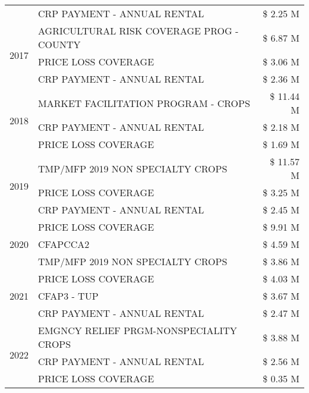 \begin{tabular}{llr}
 & CRP PAYMENT - ANNUAL RENTAL & \$ 2.25 M \\
\cline{1-3}
\multirow[t]{3}{*}{2017} & AGRICULTURAL RISK COVERAGE PROG - COUNTY & \$ 6.87 M \\
 & PRICE LOSS COVERAGE & \$ 3.06 M \\
 & CRP PAYMENT - ANNUAL RENTAL & \$ 2.36 M \\
\cline{1-3}
\multirow[t]{3}{*}{2018} & MARKET FACILITATION PROGRAM - CROPS & \$ 11.44 M \\
 & CRP PAYMENT - ANNUAL RENTAL & \$ 2.18 M \\
 & PRICE LOSS COVERAGE & \$ 1.69 M \\
\cline{1-3}
\multirow[t]{3}{*}{2019} & TMP/MFP 2019 NON SPECIALTY CROPS & \$ 11.57 M \\
 & PRICE LOSS COVERAGE & \$ 3.25 M \\
 & CRP PAYMENT - ANNUAL RENTAL & \$ 2.45 M \\
\cline{1-3}
\multirow[t]{3}{*}{2020} & PRICE LOSS COVERAGE & \$ 9.91 M \\
 & CFAPCCA2 & \$ 4.59 M \\
 & TMP/MFP 2019 NON SPECIALTY CROPS & \$ 3.86 M \\
\cline{1-3}
\multirow[t]{3}{*}{2021} & PRICE LOSS COVERAGE & \$ 4.03 M \\
 & CFAP3 - TUP & \$ 3.67 M \\
 & CRP PAYMENT - ANNUAL RENTAL & \$ 2.47 M \\
\cline{1-3}
\multirow[t]{3}{*}{2022} & EMGNCY RELIEF PRGM-NONSPECIALITY CROPS & \$ 3.88 M \\
 & CRP PAYMENT - ANNUAL RENTAL & \$ 2.56 M \\
 & PRICE LOSS COVERAGE & \$ 0.35 M \\
\cline{1-3}
\bottomrule
\end{tabular}

